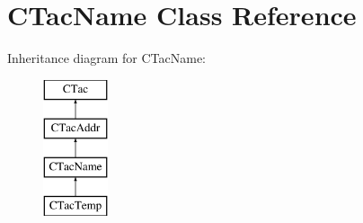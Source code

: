 \hypertarget{classCTacName}{\section{C\-Tac\-Name Class Reference}
\label{classCTacName}
}
Inheritance diagram for C\-Tac\-Name\-:\begin{figure}[H]
\begin{center}
\leavevmode
\includegraphics[height=4.000000cm]{classCTacName}
\end{center}
\end{figure}
